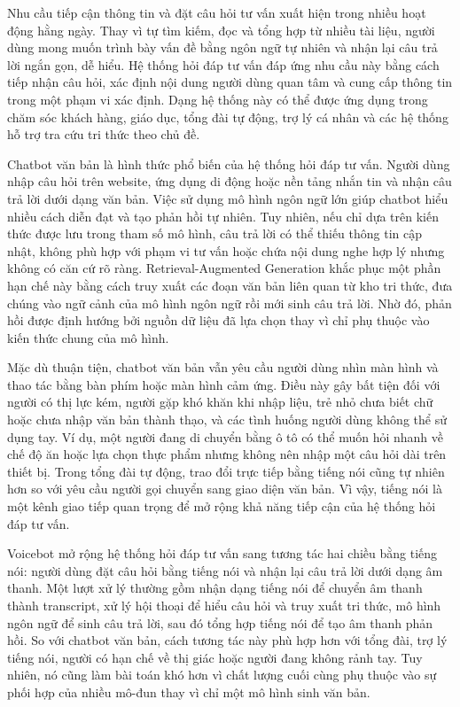 \documentclass[a4paper,13pt,twoside]{report}
\begin{document}
Nhu cầu tiếp cận thông tin và đặt câu hỏi tư vấn xuất hiện trong nhiều hoạt động hằng ngày. Thay vì tự tìm kiếm, đọc và tổng hợp từ nhiều tài liệu, người dùng mong muốn trình bày vấn đề bằng ngôn ngữ tự nhiên và nhận lại câu trả lời ngắn gọn, dễ hiểu. Hệ thống hỏi đáp tư vấn đáp ứng nhu cầu này bằng cách tiếp nhận câu hỏi, xác định nội dung người dùng quan tâm và cung cấp thông tin trong một phạm vi xác định. Dạng hệ thống này có thể được ứng dụng trong chăm sóc khách hàng, giáo dục, tổng đài tự động, trợ lý cá nhân và các hệ thống hỗ trợ tra cứu tri thức theo chủ đề.

Chatbot văn bản là hình thức phổ biến của hệ thống hỏi đáp tư vấn. Người dùng nhập câu hỏi trên website, ứng dụng di động hoặc nền tảng nhắn tin và nhận câu trả lời dưới dạng văn bản. Việc sử dụng mô hình ngôn ngữ lớn giúp chatbot hiểu nhiều cách diễn đạt và tạo phản hồi tự nhiên. Tuy nhiên, nếu chỉ dựa trên kiến thức được lưu trong tham số mô hình, câu trả lời có thể thiếu thông tin cập nhật, không phù hợp với phạm vi tư vấn hoặc chứa nội dung nghe hợp lý nhưng không có căn cứ rõ ràng. Retrieval-Augmented Generation khắc phục một phần hạn chế này bằng cách truy xuất các đoạn văn bản liên quan từ kho tri thức, đưa chúng vào ngữ cảnh của mô hình ngôn ngữ rồi mới sinh câu trả lời. Nhờ đó, phản hồi được định hướng bởi nguồn dữ liệu đã lựa chọn thay vì chỉ phụ thuộc vào kiến thức chung của mô hình.

Mặc dù thuận tiện, chatbot văn bản vẫn yêu cầu người dùng nhìn màn hình và thao tác bằng bàn phím hoặc màn hình cảm ứng. Điều này gây bất tiện đối với người có thị lực kém, người gặp khó khăn khi nhập liệu, trẻ nhỏ chưa biết chữ hoặc chưa nhập văn bản thành thạo, và các tình huống người dùng không thể sử dụng tay. Ví dụ, một người đang di chuyển bằng ô tô có thể muốn hỏi nhanh về chế độ ăn hoặc lựa chọn thực phẩm nhưng không nên nhập một câu hỏi dài trên thiết bị. Trong tổng đài tự động, trao đổi trực tiếp bằng tiếng nói cũng tự nhiên hơn so với yêu cầu người gọi chuyển sang giao diện văn bản. Vì vậy, tiếng nói là một kênh giao tiếp quan trọng để mở rộng khả năng tiếp cận của hệ thống hỏi đáp tư vấn.

Voicebot mở rộng hệ thống hỏi đáp tư vấn sang tương tác hai chiều bằng tiếng nói: người dùng đặt câu hỏi bằng tiếng nói và nhận lại câu trả lời dưới dạng âm thanh. Một lượt xử lý thường gồm nhận dạng tiếng nói để chuyển âm thanh thành transcript, xử lý hội thoại để hiểu câu hỏi và truy xuất tri thức, mô hình ngôn ngữ để sinh câu trả lời, sau đó tổng hợp tiếng nói để tạo âm thanh phản hồi. So với chatbot văn bản, cách tương tác này phù hợp hơn với tổng đài, trợ lý tiếng nói, người có hạn chế về thị giác hoặc người đang không rảnh tay. Tuy nhiên, nó cũng làm bài toán khó hơn vì chất lượng cuối cùng phụ thuộc vào sự phối hợp của nhiều mô-đun thay vì chỉ một mô hình sinh văn bản.
\end{document}
